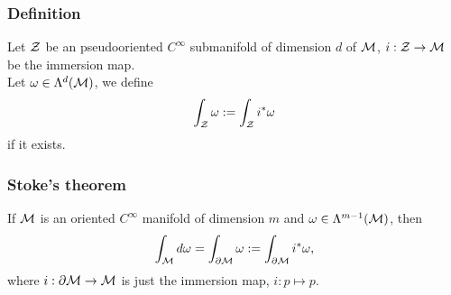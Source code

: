 \documentclass[../main.tex]{subfiles}
\begin{document}
    \subsubsection{Definition}
    \begin{definition}\label{def:pullback-integral}
        Let \(\manifold[Z]\) be an pseudooriented \(C^\infty\) submanifold of 
        dimension \(d\) of \(\manifold[M]\), \(i : \manifold[Z] \to \manifold[M]\) be 
        the immersion map. \\
        Let \(\omega \in \form{d}{M}\), we define 
        \[
        \int_{\manifold[Z]}\omega := \int_{\manifold[Z]}^{} i^*\omega
        \]
        if it exists.
    \end{definition}
    \subsubsection{Stoke's theorem}
    \begin{theorem}\label{thm:stokes-theorem}
        If \(\manifold[M]\) is an oriented \(C^\infty\) manifold of dimension \(m\) 
        and \(\omega \in \form{{m-1}}{M}\), then 
        \[
        \int_{\manifold[M]}^{}d\omega = \int_{\partial \manifold[M]}^{}\omega
        := \int_{\partial \manifold[M]}^{} i^*\omega,
        \]
        where \(i : \partial \manifold[M] \to \manifold[M]\) is just the immersion 
        map, \(i : p \mapsto p\).
    \end{theorem}
\end{document}
